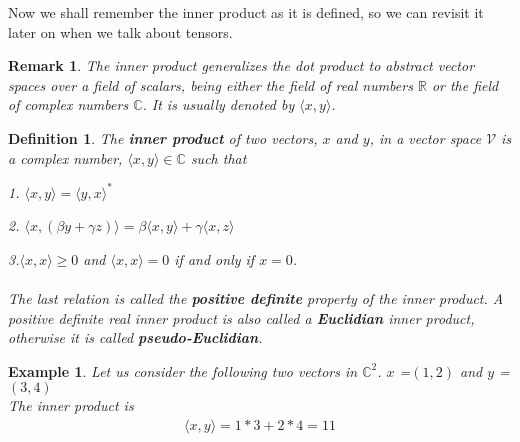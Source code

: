 \documentclass[12pt,a4paper]{article}
\newtheorem{remark}[thm]{Remark}
\newtheorem{defn}[thm]{Definition}
\newtheorem{exmp}{Example}[section]
\begin{document}
Now we shall remember the inner product as it is defined, so we can revisit it later on when we talk about tensors.
\begin{remark}
The inner product generalizes the dot product to abstract vector spaces over a field of scalars, being either the field of real numbers $\mathbb{R}$ or the field of complex numbers $\mathbb{C}$. It is usually denoted by $\langle x, y\rangle$.
\end{remark}
\begin{defn}
The \textbf{inner product} of two vectors, $x$ and $y$, in a vector space $\mathcal{V}$ is a complex number, $\langle x, y\rangle \in \mathbb{C}$ such that\\
\item \hspace{1cm} 1. $\langle x, y \rangle  = \langle y, x \rangle^*$
\item \hspace{1cm} 2. $\langle x, (\beta y + \gamma z) \rangle = \beta \langle x, y\rangle + \gamma \langle x, z\rangle$
\item \hspace{1cm} 3.$\langle x,x \rangle \geqslant 0 $ and $ \langle x, x \rangle = 0$ if and only if $x = 0$.\\ \\
The last relation is called the \textbf{positive definite} property of the inner product. A positive definite real inner product is also called a \textbf{Euclidian} inner product, otherwise it is called \textbf{pseudo-Euclidian}.
\end{defn}
\begin{exmp} Let us consider the following two vectors in $\mathbb{C}^2$. $x$ =$(1, 2)$ and $y$ = $(3, 4)$\\
The inner product is
\begin{align*}
 \langle x, y \rangle = 1 * 3 + 2 * 4 = 11
\end{align*}
\end{exmp}
\end{document}
